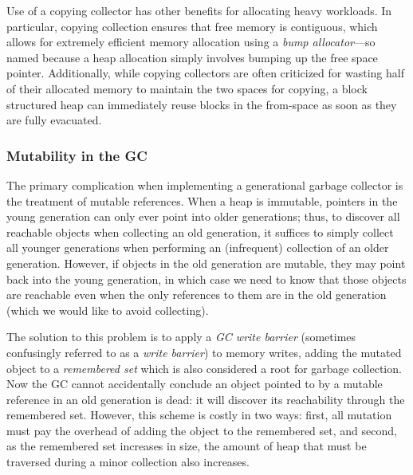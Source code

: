 Use of a copying collector has other benefits for allocating heavy
workloads.  In particular, copying collection ensures that free memory
is contiguous, which allows for extremely efficient memory allocation
using a \emph{bump allocator}---so named because a heap allocation
simply involves bumping up the free space pointer. Additionally, while
copying collectors are often criticized for wasting half of their
allocated memory to maintain the two spaces for copying, a block
structured heap can immediately reuse blocks in the from-space as soon
as they are fully evacuated.

\subsubsection{Mutability in the GC}

The primary complication when implementing a generational garbage
collector is the treatment of mutable references.  When a heap is
immutable, pointers in the young generation can only ever point into
older generations; thus, to discover all reachable objects when
collecting an old generation, it suffices to simply collect all younger
generations when performing an (infrequent) collection of an older
generation.  However, if objects in the old generation are mutable, they
may point back into the young generation, in which case we need to know
that those objects are reachable even when the only references to them
are in the old generation (which we would like to avoid collecting).

The solution to this problem is to apply a \emph{GC write barrier}
(sometimes confusingly referred to as a \emph{write barrier}) to memory
writes, adding the mutated object to a \emph{remembered set} which is
also considered a root for garbage collection.  Now the GC cannot
accidentally conclude an object pointed to by a mutable reference in an
old generation is dead: it will discover its reachability through the
remembered set.  However, this scheme is costly in two ways: first, all
mutation must pay the overhead of adding the object to the remembered
set, and second, as the remembered set increases in size, the amount of
heap that must be traversed during a minor collection also increases.

